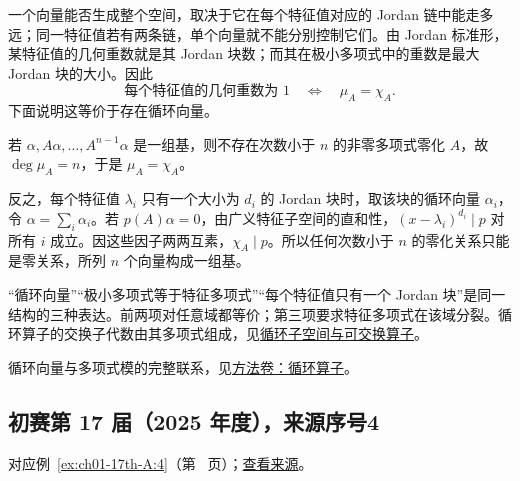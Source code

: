 \documentclass[12pt,fontset=fandol]{ctexart}
\begin{document}
\begin{solve}

一个向量能否生成整个空间，取决于它在每个特征值对应的 Jordan 链中能走多远；同一特征值若有两条链，单个向量就不能分别控制它们。由 Jordan 标准形，某特征值的几何重数就是其 Jordan 块数；而其在极小多项式中的重数是最大 Jordan 块的大小。因此
\[
\text{每个特征值的几何重数为 }1
\quad\Longleftrightarrow\quad \mu_A=\chi_A.
\]
下面说明这等价于存在循环向量。

若 $\alpha,A\alpha,\ldots,A^{n-1}\alpha$ 是一组基，则不存在次数小于 $n$ 的非零多项式零化 $A$，故 $\deg\mu_A=n$，于是 $\mu_A=\chi_A$。

反之，每个特征值 $\lambda_i$ 只有一个大小为 $d_i$ 的 Jordan 块时，取该块的循环向量 $\alpha_i$，令 $\alpha=\sum_i\alpha_i$。若 $p(A)\alpha=0$，由广义特征子空间的直和性，$(x-\lambda_i)^{d_i}\mid p$ 对所有 $i$ 成立。因这些因子两两互素，$\chi_A\mid p$。所以任何次数小于 $n$ 的零化关系只能是零关系，所列 $n$ 个向量构成一组基。

\end{solve}

\begin{remark}[方法与条件]

“循环向量”“极小多项式等于特征多项式”“每个特征值只有一个 Jordan 块”是同一结构的三种表达。前两项对任意域都等价；第三项要求特征多项式在该域分裂。循环算子的交换子代数由其多项式组成，见\hyperref[pr:ch01-17th-A:4]{循环子空间与可交换算子}。

循环向量与多项式模的完整联系，见\hyperref[app:linear-cyclic]{方法卷：循环算子}。

\end{remark}

\subsection{初赛第 17 届（2025 年度），来源序号4}\label{ans:ch01-17th-A:4}\label{pr:ch01-17th-A:4}

对应例~\ref{ex:ch01-17th-A:4}（第~\pageref{ex:ch01-17th-A:4} 页）；\href{https://github.com/lzxcr/cmc-mathematics/blob/64916fa1fdbc3e444a652eca204d5669058ee321/src/problems/preliminary/17/04.md}{查看来源}。
\end{document}
